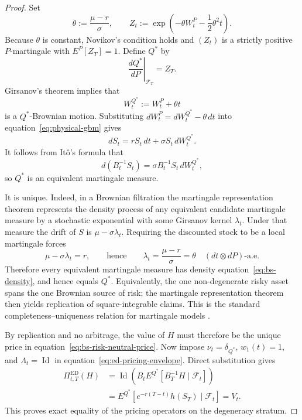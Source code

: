 \begin{proof}
Set
\begin{equation}
  \theta:=\frac{\mu-r}{\sigma},
  \qquad
  Z_t:=\exp\!\left(-\theta W_t^P-\frac12\theta^2t\right).
  \label{eq:bs-density}
\end{equation}
Because $\theta$ is constant, Novikov's condition holds and $(Z_t)$ is a
strictly positive $P$-martingale with $E^P[Z_T]=1$.  Define $Q^*$ by
\begin{equation}
  \left.\frac{dQ^*}{dP}\right|_{\mathcal F_T}=Z_T.
  \label{eq:qstar-definition}
\end{equation}
Girsanov's theorem implies that
\begin{equation}
  W_t^{Q^*}:=W_t^P+\theta t
  \label{eq:qstar-brownian}
\end{equation}
is a $Q^*$-Brownian motion.  Substituting
$dW_t^P=dW_t^{Q^*}-\theta\,dt$ into
equation~\eqref{eq:physical-gbm} gives
\begin{equation}
  dS_t=rS_t\,dt+\sigma S_t\,dW_t^{Q^*}.
  \label{eq:risk-neutral-gbm}
\end{equation}
It follows from It\^o's formula that
\begin{equation}
  d(B_t^{-1}S_t)=\sigma B_t^{-1}S_t\,dW_t^{Q^*},
  \label{eq:discounted-martingale}
\end{equation}
so $Q^*$ is an equivalent martingale measure.

It is unique.  Indeed, in a Brownian filtration the martingale representation
theorem represents the density process of any equivalent candidate martingale
measure by a stochastic exponential with some Girsanov kernel $\lambda_t$.
Under that measure the drift of $S$ is $\mu-\sigma\lambda_t$.  Requiring the
discounted stock to be a local martingale forces
\begin{equation}
  \mu-\sigma\lambda_t=r,
  \qquad\text{hence}\qquad
  \lambda_t=\frac{\mu-r}{\sigma}=\theta
  \quad(dt\otimes dP)\text{-a.e.}
  \label{eq:unique-kernel}
\end{equation}
Therefore every equivalent martingale measure has density
equation~\eqref{eq:bs-density}, and hence equals $Q^*$.  Equivalently, the one
non-degenerate risky asset spans the one Brownian source of risk; the martingale
representation theorem then yields replication of square-integrable claims.
This is the standard completeness--uniqueness relation for martingale models
\cite{harrisonpliska1983}.

By replication and no arbitrage, the value of $H$ must therefore be the unique
price in equation~\eqref{eq:bs-risk-neutral-price}.  Now impose
$\nu_t=\delta_{Q^*}$, $w_1(t)=1$, and
$\Lambda_t=\operatorname{Id}$ in
equation~\eqref{eq:ed-pricing-envelope}.  Direct substitution gives
\begin{align}
  \Pi^{\mathrm{ED}}_{t,T}(H)
  &=\operatorname{Id}\!\left(
      B_tE^{Q^*}[B_T^{-1}H\mid\mathcal F_t]
    \right)\\
  &=E^{Q^*}[e^{-r(T-t)}h(S_T)\mid\mathcal F_t]
   =V_t.
  \label{eq:exact-envelope-collapse}
\end{align}
This proves exact equality of the pricing operators on the degeneracy stratum.


\end{proof}
